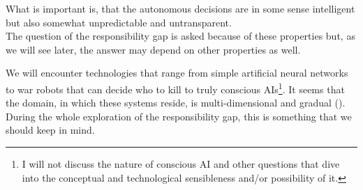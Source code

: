 \documentclass{article}
\begin{document}
What is important is, that the autonomous decisions are in some sense
intelligent but also somewhat unpredictable and untransparent.\\

The question of the responsibility gap is asked because of these properties but,
as we will see later, the answer may depend on other properties as well.

We will encounter technologies that range from simple artificial
neural networks to war robots that can decide who to kill to truly conscious AIs\footnote{I will not discuss the nature of
	conscious AI and other questions that dive into the conceptual and
technological sensibleness and/or possibility of it.}. It seems that the domain,
in which these systems reside, is multi-dimensional and gradual (\cite[p.
75]{misselhorn2018grundfragen}). During the whole exploration of the
responsibility gap, this is something that we should keep in mind.\\

%
% 
%
%
%
%
%
%
%
%
%
%
\end{document}
